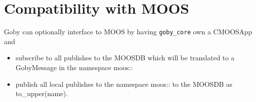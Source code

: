 \documentclass[10pt,letterpaper]{article}
\begin{document}
\section{Compatibility with MOOS}
Goby can optionally interface to MOOS by having \verb|goby_core| own a CMOOSApp and 
\begin{itemize}
\item subscribe to all publishes to the MOOSDB which will be translated to a GobyMessage in the namespace moos::
\item publish all local publishes to the namespace moos:: to the MOOSDB as to\_upper(name).
\end{itemize}
\end{document}
